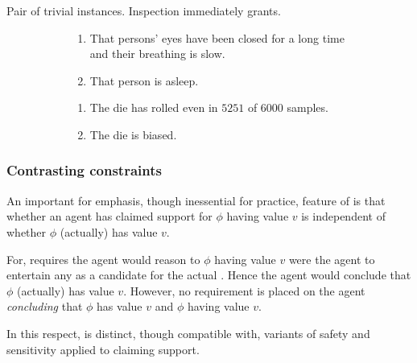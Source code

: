\begin{note}
  Pair of trivial instances.
  Inspection immediately grants.
  \begin{illustration}
    \begin{figure}[h!]
    \mbox{}\hfill
    \begin{subfigure}{0.45\linewidth}
      \begin{enumerate}
      \item That persons' eyes have been closed for a long time and their breathing is slow.
      \item That person is asleep.
      \end{enumerate}
      \caption{}
    \end{subfigure}
    \hfill
    \begin{subfigure}{0.45\linewidth}
      \begin{enumerate}
      \item The die has rolled even in \(5251\) of \(6000\) samples.
      \item The die is biased.
      \end{enumerate}
      \caption{}
    \end{subfigure}
    \hfill\mbox{}
    \caption{}
    \label{fig:ideaS:basic-examples}
  \end{figure}
\end{illustration}
\end{note}


\subsubsection{Contrasting constraints}
\label{sec:ideaS:contrast}

\begin{note}
  An important for emphasis, though inessential for practice, feature of \ideaS{} is that whether an agent has claimed support for \(\phi\) having value \(v\) is independent of whether \(\phi\) (actually) has value \(v\).

  For, \ideaS{} requires the agent would reason to \(\phi\) having value \(v\) were the agent to entertain any \epPW{} as a candidate for the actual \world{}.
  Hence the agent would conclude that \(\phi\) (actually) has value \(v\).
  However, no requirement is placed on the agent \emph{concluding} that \(\phi\) has value \(v\) and \(\phi\) having value \(v\).

  In this respect, \ideaS{} is distinct, though compatible with, variants of safety and sensitivity applied to claiming support.
\end{note}

